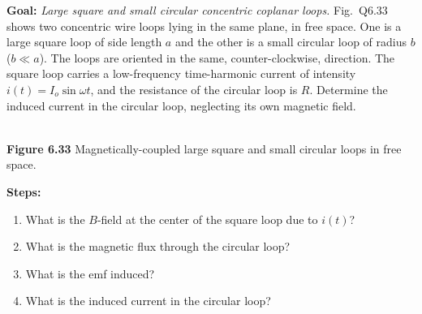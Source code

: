 \documentclass[../../header.tex]{subfiles}
\begin{document}
\textbf{Goal:} \textit{Large square and small circular concentric coplanar loops.} Fig.~Q6.33 shows two concentric wire loops lying in the same plane, in free space. One is a large square loop of side length $a$ and the other is a small circular loop of radius $b$ ($b \ll a$). The loops are oriented in the same, counter-clockwise, direction. The square loop carries a low-frequency time-harmonic current of intensity $i(t) = I_o \sin \omega t$, and the resistance of the circular loop is $R$. Determine the induced current in the circular loop, neglecting its own magnetic field.
\begin{center}
\\
\textbf{Figure 6.33} Magnetically-coupled large square and small circular loops in free space.
\end{center}
\textbf{Steps:} 
\begin{enumerate}
\item What is the $B$-field at the center of the square loop due to $i(t)$?


\item What is the magnetic flux through the circular loop?


\item What is the emf induced?


\item What is the induced current in the circular loop?


\end{enumerate}
\end{document}
